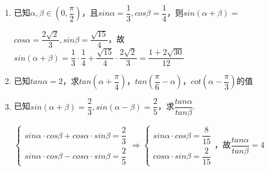 \begin{enumerate}
\begin{jieda}
        \ps $sin\left(\dfrac{\pi}{4} - \alpha\right)$与$cos\left(\dfrac{\pi}{4} + \alpha\right)$恒等，$sin\left(\dfrac{\pi}{4} - \alpha\right) = sin\left(\dfrac{\pi}{2}-\left(\alpha + \dfrac{\pi}{4}\right)\right) = cos\left(\dfrac{\pi}{4} + \alpha\right)$
    \end{jieda}
    \item 已知$\alpha, \beta \in \left(0, \dfrac{\pi}{2}\right)$，且$sin\alpha = \dfrac{1}{3}, cos\beta = \dfrac{1}{4}$，则$sin\left(\alpha + \beta\right) = $
    \begin{jieda}
        $cos\alpha = \dfrac{2\sqrt{2}}{3}, sin\beta = \dfrac{\sqrt{15}}{4}$，故$sin\left(\alpha + \beta\right) = \dfrac{1}{3} \cdot \dfrac{1}{4} + \dfrac{\sqrt{15}}{4} \cdot \dfrac{2\sqrt{2}}{3}  = \dfrac{1 + 2\sqrt{30}}{12}$
    \end{jieda}
    \item 已知$tan\alpha = 2$，求$tan\left(\alpha + \dfrac{\pi}{4}\right)$，$tan\left(\dfrac{\pi}{6} - \alpha\right)$，$cot\left(\alpha - \dfrac{\pi}{3}\right)$的值
    \begin{jieda}
    \end{jieda}


    \item 已知$sin\left(\alpha + \beta\right) = \dfrac{2}{3}, sin\left(\alpha - \beta\right) = \dfrac{2}{5}$，求$\dfrac{tan\alpha}{tan\beta}$.
    \begin{jieda}
        $\left \{ \begin{array}{l}
             sin\alpha \cdot cos\beta + cos\alpha \cdot sin\beta = \dfrac{2}{3}  \\
             sin\alpha \cdot cos\beta - cos\alpha \cdot sin\beta = \dfrac{2}{5}
        \end{array} \right. \Longrightarrow \left \{ \begin{array}{l}
             sin\alpha \cdot cos\beta = \dfrac{8}{15}  \\
             cos\alpha \cdot sin\beta = \dfrac{2}{15}
        \end{array} \right.$，故$\dfrac{tan\alpha}{tan\beta} = 4$
    \end{jieda}
    

\end{enumerate}
